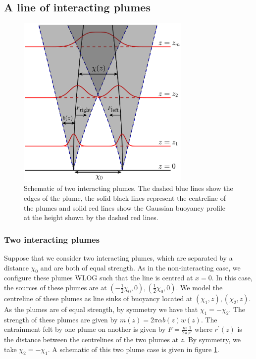\documentclass{jfm}
\begin{document}
	\subsection{A line of interacting plumes}\label{subsec:Line of interacting plumes}
    \begin{figure}
	\centering
		\includegraphics[trim = {9.5cm 1cm 9.5cm 1cm}, clip,width = 0.75\textwidth]{interactingTwoPlumeSchematic.eps}
		\caption{Schematic of two interacting plumes. The dashed blue lines show the edges of the plume, the solid black lines represent the centreline of the plumes and solid red lines show the Gaussian buoyancy profile at the height shown by the dashed red lines.}
		\label{fig:twoInteractingPlumesSchematic}
	\end{figure}
	\subsubsection{Two interacting plumes}
	Suppose that we consider two interacting plumes, which are separated by a distance $\chi_0$ and are both of equal strength. As in the non-interacting case, we configure these plumes WLOG such that the line is centred at $x = 0$. In this case, the sources of these plumes are at $(-\tfrac{1}{2}\chi_0,0), (\tfrac{1}{2}\chi_0,0)$. We model the centreline of these plumes as line sinks of buoyancy located at $(\chi_1,z),(\chi_2,z)$. As the plumes are of equal strength, by symmetry we have that $\chi_1 = -\chi_2$. The strength of these plumes are given by $m(z) = 2\pi\alpha b(z)w(z)$. The entrainment felt by one plume on another is given by $F = \tfrac{m}{2\pi}\tfrac{1}{r^{\prime}}$ where $r^{\prime}(z)$ is the distance between the centrelines of the two plumes at $z$. By symmetry, we take $\chi_2 = -\chi_1$. A schematic of this two plume case is given in figure \ref{fig:twoInteractingPlumesSchematic}. \\
	
\end{document}
